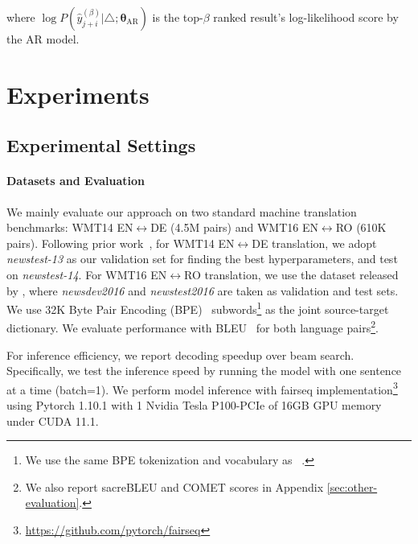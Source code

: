 where $\log P(\hat{y}_{j+i}^{(\beta)}|\triangle;\bm{\theta}_{\textrm{AR}})$ is the top-$\beta$ ranked result's log-likelihood score by the AR model.

\section{Experiments}
\subsection{Experimental Settings}
\label{sec:settings}
\paragraph{Datasets and Evaluation} We mainly evaluate our approach on two standard machine translation benchmarks: WMT14 EN$\leftrightarrow$DE (4.5M pairs) and WMT16 EN$\leftrightarrow$RO (610K pairs). Following prior work~\citep{ott-etal-2018-scaling}, for WMT14 EN$\leftrightarrow$DE translation, we adopt \textit{newstest-13} as our validation set for finding the best hyperparameters, and test on \textit{newstest-14}. For WMT16 EN$\leftrightarrow$RO translation, we use the dataset released by \citet{Lee:2018}, where \textit{newsdev2016} and \textit{newstest2016} are taken as validation and test sets. We use 32K Byte Pair Encoding (BPE)~\citep{Sennrich:2016} subwords\footnote{We use the same BPE tokenization and vocabulary as ~\citet{Ghazvininejad:2019}.} as the joint source-target dictionary. We evaluate performance with BLEU~\citep{Papineni:2002} for both language pairs\footnote{We also report sacreBLEU \cite{Post:2018} and COMET \cite{Rei:2020} scores in Appendix \ref{sec:other-evaluation}.}. 

For inference efficiency, we report decoding speedup over beam search. Specifically, we test the inference speed by running the model with one sentence at a time (batch=1). We perform model inference with fairseq implementation\footnote{\url{https://github.com/pytorch/fairseq}} using Pytorch 1.10.1 with 1 Nvidia Tesla P100-PCIe of 16GB GPU memory under CUDA 11.1.

